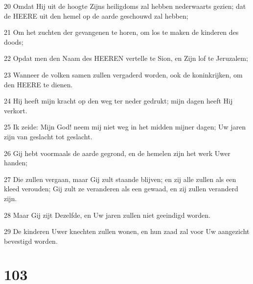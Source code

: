 \par 20 Omdat Hij uit de hoogte Zijns heiligdoms zal hebben nederwaarts gezien; dat de HEERE uit den hemel op de aarde geschouwd zal hebben;
\par 21 Om het zuchten der gevangenen te horen, om los te maken de kinderen des doods;
\par 22 Opdat men den Naam des HEEREN vertelle te Sion, en Zijn lof te Jeruzalem;
\par 23 Wanneer de volken samen zullen vergaderd worden, ook de koninkrijken, om den HEERE te dienen.
\par 24 Hij heeft mijn kracht op den weg ter neder gedrukt; mijn dagen heeft Hij verkort.
\par 25 Ik zeide: Mijn God! neem mij niet weg in het midden mijner dagen; Uw jaren zijn van geslacht tot geslacht.
\par 26 Gij hebt voormaals de aarde gegrond, en de hemelen zijn het werk Uwer handen;
\par 27 Die zullen vergaan, maar Gij zult staande blijven; en zij alle zullen als een kleed verouden; Gij zult ze veranderen als een gewaad, en zij zullen veranderd zijn.
\par 28 Maar Gij zijt Dezelfde, en Uw jaren zullen niet geeindigd worden.
\par 29 De kinderen Uwer knechten zullen wonen, en hun zaad zal voor Uw aangezicht bevestigd worden.

\chapter{103}


